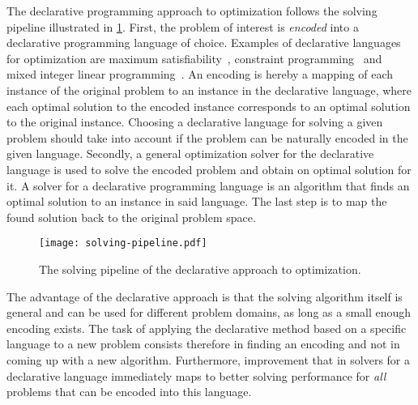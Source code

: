 The declarative programming approach to optimization follows the solving pipeline illustrated in \cref{fig:solving-pipeline}.
First, the problem of interest is \emph{encoded} into a declarative programming language of choice.
Examples of declarative languages for optimization are maximum satisfiability~\autocite{handbook2-maxsat}, constraint programming~\autocite{DBLP:reference/fai/2} and mixed integer linear programming~\autocites{ChenEtAl2010-intro,KorteVygen2018-5}.
An encoding is hereby a mapping of each instance of the original problem to an instance in the declarative language, where each optimal solution to the encoded instance corresponds to an optimal solution to the original instance.
Choosing a declarative language for solving a given problem should take into account if the problem can be naturally encoded in the given language.
Secondly, a general optimization solver for the declarative language is used to solve the encoded problem and obtain on optimal solution for it.
A solver for a declarative programming language is an algorithm that finds an optimal solution to an instance in said language.
The last step is to map the found solution back to the original problem space.

\begin{figure}
  \centering
  \texttt{[image: solving-pipeline.pdf]}
  \caption{The solving pipeline of the declarative approach to optimization.}\label{fig:solving-pipeline}
\end{figure}

The advantage of the declarative approach is that the solving algorithm itself is general and can be used for different problem domains, as long as a small enough encoding exists.
The task of applying the declarative method based on a specific language to a new problem consists therefore in finding an encoding and not in coming up with a new algorithm.
Furthermore, improvement that in solvers for a declarative language immediately maps to better solving performance for \emph{all} problems that can be encoded into this language.

